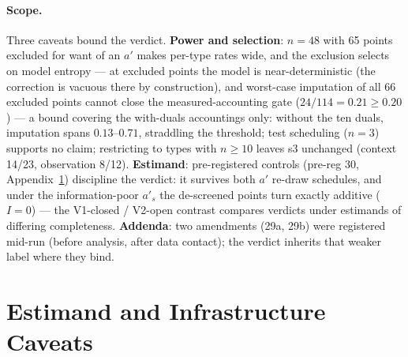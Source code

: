 \documentclass{article}
\theoremstyle{remark}
\begin{document}
\paragraph{Scope.} Three caveats bound the verdict. \textbf{Power and
selection}: $n=48$ with 65 points excluded for want of an $a'$ makes
per-type rates wide, and the exclusion selects on model entropy --- at
excluded points the model is near-deterministic (the correction is
vacuous there by construction), and worst-case imputation of all 66
excluded points cannot close the measured-accounting gate ($24/114 =
0.21 \geq 0.20$) --- a bound covering the with-duals accountings only:
without the ten duals, imputation spans $0.13$--$0.71$, straddling the
threshold; test scheduling ($n=3$) supports no claim; restricting to types
with $n \geq 10$ leaves s3 unchanged (context 14/23, observation 8/12).
\textbf{Estimand}: pre-registered controls (pre-reg 30,
Appendix~\ref{app:estimand}) discipline the verdict: it survives both
$a'$ re-draw schedules, and under the information-poor $a'_s$ the
de-screened points turn exactly additive ($I=0$) --- the V1-closed /
V2-open contrast compares verdicts under estimands of differing
completeness. \textbf{Addenda}: two amendments (29a, 29b) were registered
mid-run (before analysis, after data contact); the verdict inherits that
weaker label where they bind.

\section{Estimand and Infrastructure Caveats}
\label{app:estimand}
\end{document}
